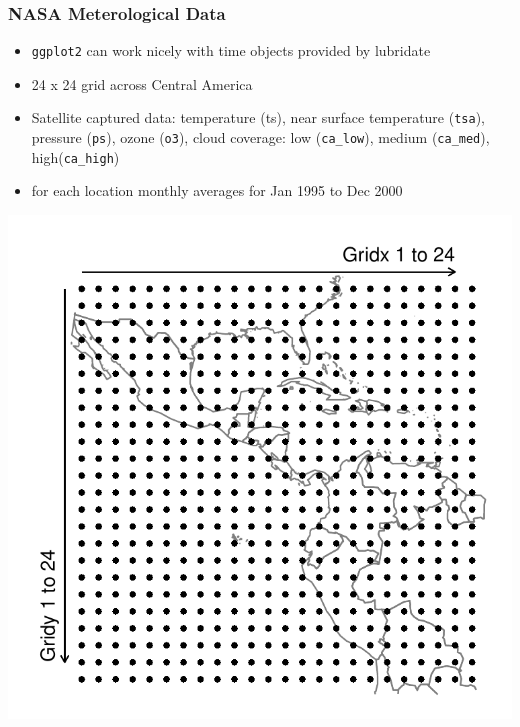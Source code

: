 \documentclass{beamer}\usepackage[]{graphicx}\usepackage[]{color}
\begin{document}
\begin{frame}[fragile]
\frametitle{NASA Meterological Data}
\begin{minipage}{.4\linewidth}\footnotesize
\begin{itemize}
\item \texttt{ggplot2} can work nicely with time objects provided by lubridate
\item 24 x 24 grid across Central America
\item Satellite captured data: temperature (ts), near surface temperature (\texttt{tsa}), pressure (\texttt{ps}), ozone (\texttt{o3}), cloud coverage: low (\verb|ca_low|), medium (\verb|ca_med|), high(\verb|ca_high|)
\item for each location monthly averages for Jan 1995 to Dec 2000
\end{itemize}
\end{minipage}\hfill\begin{minipage}{.59\linewidth}
\hfil\includegraphics[width=\linewidth]{figure/nasa1}
\end{minipage}
\end{frame}
\end{document}
